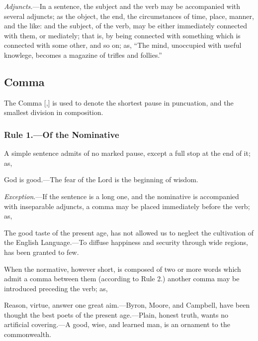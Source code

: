 \emph{Adjuncts.}---In a sentence, the subject and the verb may be accompanied
with several adjuncts; as the object, the end, the circumstances of time, place,
manner, and the like: and the subject, of the verb, may be either immediately
connected with them, or mediately; that is, by being connected with something
which is connected with some other, and so on; as, ``The mind, unoccupied with
useful knowlege, becomes a magazine of trifles and follies.''
\normalsize

\subsection{Comma}

The Comma [,] is used to denote the shortest pause in puncuation, and the
smallest division in composition.

\subsubsection{Rule 1.---Of the Nominative}

A simple sentence admits of no marked pause, except a full stop at the end of
it; as,

\begin{example}
God is good.---The fear of the Lord is the beginning of wisdom.
\end{example}

\emph{Exception}.---If the sentence is a long one, and the nominative is
accompanied with inseparable adjuncts, a comma may be placed immediately before
the verb; as,

\begin{example}
The good taste of the present age, has not allowed us to neglect the cultivation
of the English Language.---To diffuse happiness and security through wide
regions, has been granted to few.
\end{example}

When the normative, however short, is composed of two or more words which admit
a comma between them (according to Rule 2.) another comma may be introduced
preceding the verb; as,

\begin{example}
Reason, virtue, answer one great aim.---Byron, Moore, and Campbell, have been
thought the best poets of the present age.---Plain, honest truth, wants no
artificial covering.---A good, wise, and learned man, is an ornament to the
commonwealth.
\end{example}

